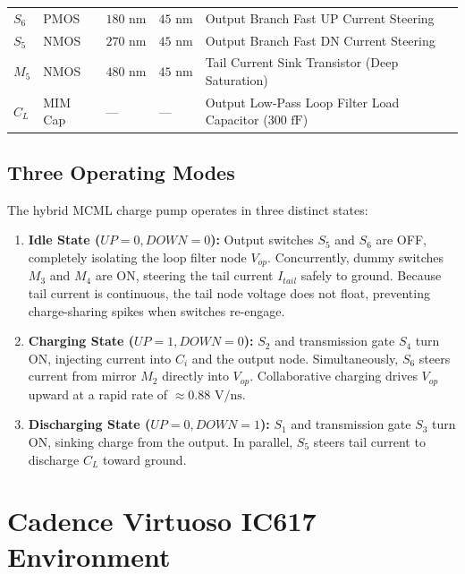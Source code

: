 \documentclass[11pt,a4paper]{report}
\begin{document}
\begin{table}[H]
\begin{tabularx}{\textwidth}{llllX}
        $S_6$ & PMOS & $180\text{ nm}$ & $45\text{ nm}$ & Output Branch Fast UP Current Steering \\
        $S_5$ & NMOS & $270\text{ nm}$ & $45\text{ nm}$ & Output Branch Fast DN Current Steering \\
        $M_5$ & NMOS & $480\text{ nm}$ & $45\text{ nm}$ & Tail Current Sink Transistor (Deep Saturation) \\
        $C_L$ & MIM Cap & --- & --- & Output Low-Pass Loop Filter Load Capacitor ($300\text{ fF}$) \\
        \bottomrule
    \end{tabularx}
\end{table}

\section{Three Operating Modes}
The hybrid MCML charge pump operates in three distinct states:
\begin{enumerate}[label=\textbf{\arabic*.}]
    \item \textbf{Idle State ($UP = 0, DOWN = 0$):} 
    Output switches $S_5$ and $S_6$ are OFF, completely isolating the loop filter node $V_{op}$. Concurrently, dummy switches $M_3$ and $M_4$ are ON, steering the tail current $I_{tail}$ safely to ground. Because tail current is continuous, the tail node voltage does not float, preventing charge-sharing spikes when switches re-engage.
    \item \textbf{Charging State ($UP = 1, DOWN = 0$):} 
    $S_2$ and transmission gate $S_4$ turn ON, injecting current into $C_i$ and the output node. Simultaneously, $S_6$ steers current from mirror $M_2$ directly into $V_{op}$. Collaborative charging drives $V_{op}$ upward at a rapid rate of $\approx 0.88\text{ V/ns}$.
    \item \textbf{Discharging State ($UP = 0, DOWN = 1$):} 
    $S_1$ and transmission gate $S_3$ turn ON, sinking charge from the output. In parallel, $S_5$ steers tail current to discharge $C_L$ toward ground.
\end{enumerate}

\newpage

\chapter{Cadence Virtuoso IC617 Environment}
\end{document}
